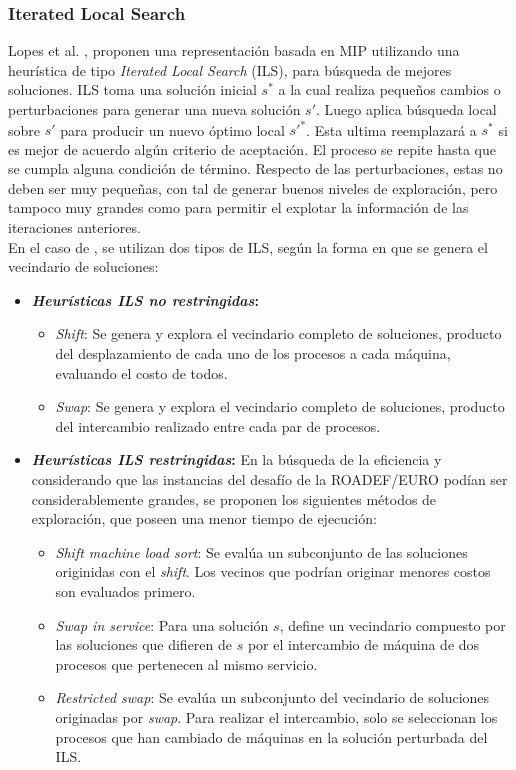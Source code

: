 \documentclass[../informe2.tex]{subfiles}
\begin{document}
\subsubsection{Iterated Local Search}
Lopes et al. \cite{lopes2015heuristics}, proponen una representación basada en MIP utilizando una heurística de tipo \textit{Iterated Local Search} (ILS), para búsqueda de mejores soluciones. ILS toma una solución inicial $s^{*}$ a la cual realiza pequeños cambios o perturbaciones para generar una nueva solución $s'$. Luego aplica búsqueda local sobre $s'$ para producir un nuevo óptimo local ${s'}^{*}$. Esta ultima reemplazará a $s^{*}$  si es mejor de acuerdo algún criterio de aceptación. El proceso se repite hasta que se cumpla alguna condición de término. Respecto de las perturbaciones, estas no deben ser muy pequeñas, con tal de generar buenos niveles de exploración, pero tampoco muy grandes como para permitir el explotar la información de las iteraciones anteriores. \\
En el caso de \cite{lopes2015heuristics}, se utilizan dos tipos de ILS, según la forma en que se genera el vecindario de soluciones:
\begin{itemize}
	\item \textbf{\textit{Heurísticas ILS no restringidas}:}
		\begin{itemize}
			\item \textit{Shift}: Se genera y explora el vecindario completo de soluciones, producto del desplazamiento de cada uno de los procesos a cada máquina, evaluando el costo de todos.
			\item \textit{Swap}: Se genera y explora el vecindario completo de soluciones, producto del intercambio realizado entre cada par de procesos.
		\end{itemize}
	\item \textbf{\textit{Heurísticas ILS restringidas}:} En la búsqueda de la eficiencia y considerando que las instancias del desafío de la ROADEF/EURO podían ser considerablemente grandes, se proponen los siguientes métodos de exploración, que poseen una menor tiempo de ejecución:
		\begin{itemize}
			\item \textit{Shift machine load sort}: Se evalúa un subconjunto de las soluciones originidas con el \emph{shift}. Los vecinos que podrían originar menores costos son evaluados primero.
			\item \textit{Swap in service}:	Para una solución $s$, define un vecindario compuesto por las soluciones que difieren de $s$ por el intercambio de máquina de dos procesos que pertenecen al mismo servicio.
			\item \textit{Restricted swap}: Se evalúa un subconjunto del vecindario de soluciones originadas por \emph{swap}. Para realizar el intercambio, solo se seleccionan los procesos que han cambiado de máquinas en la solución perturbada del ILS.
		\end{itemize}
\end{itemize}
\end{document}
